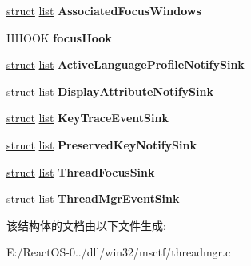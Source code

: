 \begin{DoxyCompactItemize}
\hyperlink{interfacestruct}{struct} \hyperlink{classlist}{list} {\bfseries Associated\+Focus\+Windows}
\item 
\mbox{\label{structtag_a_c_l_multi_adba50309a3a5474934eb971480aea425}} 
H\+H\+O\+OK {\bfseries focus\+Hook}
\item 
\mbox{\label{structtag_a_c_l_multi_a72ff7d38d807f94dbdd75eaec64a679d}} 
\hyperlink{interfacestruct}{struct} \hyperlink{classlist}{list} {\bfseries Active\+Language\+Profile\+Notify\+Sink}
\item 
\mbox{\label{structtag_a_c_l_multi_a0f9eca50f0105fd42e78e55b92bcfdd2}} 
\hyperlink{interfacestruct}{struct} \hyperlink{classlist}{list} {\bfseries Display\+Attribute\+Notify\+Sink}
\item 
\mbox{\label{structtag_a_c_l_multi_ad40d5bb6940a0b85ef001926763a73d0}} 
\hyperlink{interfacestruct}{struct} \hyperlink{classlist}{list} {\bfseries Key\+Trace\+Event\+Sink}
\item 
\mbox{\label{structtag_a_c_l_multi_a9dd46e04464f5dcfc2b1ae4fb5d13586}} 
\hyperlink{interfacestruct}{struct} \hyperlink{classlist}{list} {\bfseries Preserved\+Key\+Notify\+Sink}
\item 
\mbox{\label{structtag_a_c_l_multi_ab5a7aebcb0ee0f05c494550234c4ccb4}} 
\hyperlink{interfacestruct}{struct} \hyperlink{classlist}{list} {\bfseries Thread\+Focus\+Sink}
\item 
\mbox{\label{structtag_a_c_l_multi_af4220019e4cc15609901996dbb7cbcd7}} 
\hyperlink{interfacestruct}{struct} \hyperlink{classlist}{list} {\bfseries Thread\+Mgr\+Event\+Sink}
\end{DoxyCompactItemize}


该结构体的文档由以下文件生成\+:\begin{DoxyCompactItemize}
\item 
E\+:/\+React\+O\+S-\/0../dll/win32/msctf/threadmgr.\+c\end{DoxyCompactItemize}
